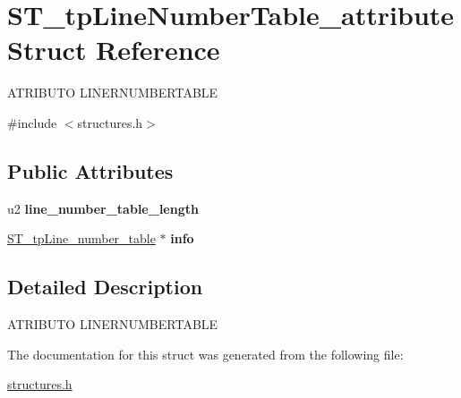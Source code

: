 \hypertarget{structST__tpLineNumberTable__attribute}{}\section{S\+T\+\_\+tp\+Line\+Number\+Table\+\_\+attribute Struct Reference}
\label{structST__tpLineNumberTable__attribute}




 A\+T\+R\+I\+B\+U\+TO L\+I\+N\+E\+R\+N\+U\+M\+B\+E\+R\+T\+A\+B\+LE  




{\ttfamily \#include $<$structures.\+h$>$}

\subsection*{Public Attributes}
\begin{DoxyCompactItemize}
\item 
\mbox{\label{structST__tpLineNumberTable__attribute_a5dbc4b24c110a135bb6a0b03a82baf60}} 
u2 {\bfseries line\+\_\+number\+\_\+table\+\_\+length}
\item 
\mbox{\label{structST__tpLineNumberTable__attribute_ab7b315954fc2f25a824922f6af70fcbb}} 
\mbox{\hyperlink{structST__tpLine__number__table}{S\+T\+\_\+tp\+Line\+\_\+number\+\_\+table}} $\ast$ {\bfseries info}
\end{DoxyCompactItemize}


\subsection{Detailed Description}


 A\+T\+R\+I\+B\+U\+TO L\+I\+N\+E\+R\+N\+U\+M\+B\+E\+R\+T\+A\+B\+LE 

The documentation for this struct was generated from the following file\+:\begin{DoxyCompactItemize}
\item 
\mbox{\hyperlink{structures_8h}{structures.\+h}}\end{DoxyCompactItemize}
